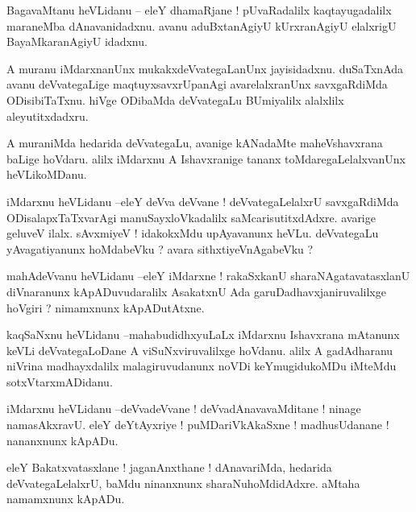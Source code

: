 \documentclass{article}
\begin{document}
\begin{mn}%
BagavaMtanu heVLidanu -- eleY dhamaRjane ! pUvaRadalilx kaqtayugadalilx maraneMba dAnavanidadxnu. 
avanu aduBxtanAgiyU kUrxranAgiyU elalxrigU BayaMkaranAgiyU idadxnu.
\end{mn}

\begin{mn}%
A muranu iMdarxnanUnx mukakxdeVvategaLanUnx jayisidadxnu. duSaTxnAda avanu deVvategaLige 
maqtuyxsavxrUpanAgi avarelalxranUnx savxgaRdiMda ODisibiTaTxnu. hiVge ODibaMda deVvategaLu 
BUmiyalilx alalxlilx aleyutitxdadxru.
\end{mn}

\begin{mn}%
A muraniMda hedarida deVvategaLu, avanige kANadaMte maheVshavxrana baLige hoVdaru. alilx iMdarxnu A 
Ishavxranige tananx toMdaregaLelalxvanUnx heVLikoMDanu.
\end{mn}

\begin{mn}%
iMdarxnu heVLidanu --eleY deVva deVvane ! deVvategaLelalxrU savxgaRdiMda ODisalapxTaTxvarAgi 
manuSayxloVkadalilx saMcarisutitxdAdxre. avarige geluveV ilalx. sAvxmiyeV ! idakokxMdu upAyavanunx 
heVLu. deVvategaLu yAvagatiyanunx hoMdabeVku ? avara sithxtiyeVnAgabeVku ?
\end{mn}

\begin{mn}%
mahAdeVvanu heVLidanu --eleY iMdarxne ! rakaSxkanU sharaNAgatavatasxlanU diVnaranunx 
kApADuvudaralilx AsakatxnU Ada garuDadhavxjaniruvalilxge hoVgiri ? nimamxnunx kApADutAtxne.
\end{mn}

\begin{mn}%
kaqSaNxnu heVLidanu --mahabudidhxyuLaLx iMdarxnu Ishavxrana mAtanunx keVLi deVvategaLoDane A 
viSuNxviruvalilxge hoVdanu. alilx A gadAdharanu niVrina madhayxdalilx malagiruvudanunx noVDi 
keYmugidukoMDu iMteMdu sotxVtarxmADidanu.
\end{mn}

\begin{mn}%
iMdarxnu heVLidanu --deVvadeVvane ! deVvadAnavavaMditane ! ninage namasAkxravU. eleY deYtAyxriye ! 
puMDariVkAkaSxne ! madhusUdanane ! nananxnunx kApADu.
\end{mn}

\begin{mn}%
eleY Bakatxvatasxlane ! jaganAnxthane ! dAnavariMda, hedarida deVvategaLelalxrU, baMdu ninanxnunx 
sharaNuhoMdidAdxre. aMtaha namamxnunx kApADu.
\end{mn}
\end{document}
